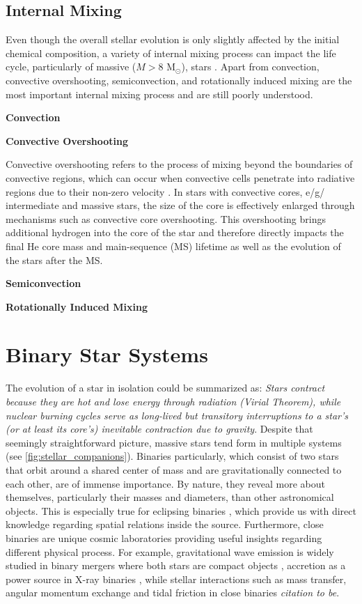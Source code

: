 \subsection{Internal Mixing}\label{sub:mixing}

Even though the overall stellar evolution is only slightly affected by the initial chemical composition, a variety of internal mixing process can impact the life cycle, particularly of massive ($M>8$ M$_{\odot}$), stars \citep{langer2012presupernova}. Apart from convection, convective overshooting, semiconvection, and rotationally induced mixing are the most important internal mixing process \citep{schootemeijer2019constraining} and are still poorly understood. 

{\bf Convection}

{\bf Convective Overshooting}

Convective overshooting refers to the process of mixing beyond the boundaries of convective regions, which can occur when convective cells penetrate into radiative regions due to their non-zero velocity \citep{alongi1993evolutionary,brott2011rotating,schootemeijer2019constraining}. In stars with convective cores, e/g/ intermediate and massive stars, the size of the core is effectively enlarged through mechanisms such as convective core overshooting. This overshooting brings additional hydrogen into the core of the star and therefore directly impacts the final He core mass and main-sequence (MS) lifetime as well as the evolution of the stars after the MS.

{\bf Semiconvection}

{\bf Rotationally Induced Mixing}

\section{Binary Star Systems}

The evolution of a star in isolation could be summarized as: {\it Stars contract because they are hot and lose energy through radiation (Virial Theorem), while nuclear burning cycles serve as long-lived but transitory interruptions to a star's (or at least its core's) inevitable contraction due to gravity}. Despite that seemingly straightforward picture, massive stars tend form in multiple systems (see \cref{fig:stellar_companions}). Binaries particularly, which consist of two stars that orbit around a shared center of mass and are gravitationally connected to each other, are of immense importance. By nature,  they reveal more about themselves, particularly their masses and diameters, than other astronomical objects. This is especially true for eclipsing binaries \citep{prvsa2016physics}, which provide us with direct knowledge regarding spatial relations inside the source. Furthermore, close binaries are unique cosmic laboratories providing useful insights regarding different physical process. For example, gravitational wave emission is widely studied in binary mergers where both stars are compact objects \citep{cutler1994gravitational,abbott2017gw170608,abbott2019gwtc}, accretion as a power source in X-ray binaries \citep{lewin1997x,reig2011x}, while stellar interactions such as mass transfer, angular momentum exchange and tidal friction in close binaries {\it citation to be}. 

